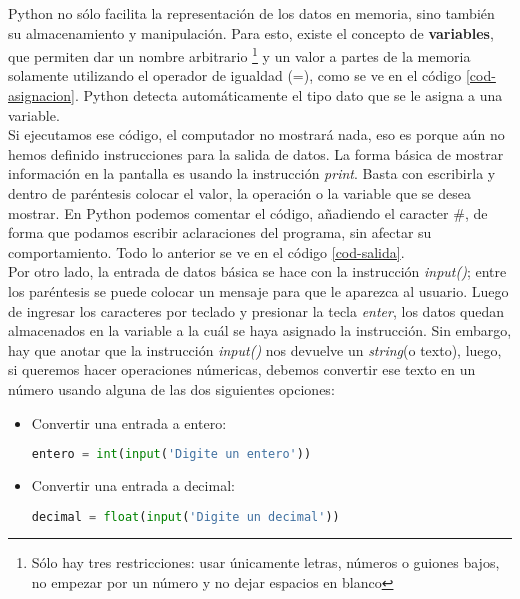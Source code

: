 Python no sólo facilita la representación de los datos en memoria, sino también su almacenamiento y manipulación. Para esto, existe el concepto de \textbf{variables}, que permiten dar un nombre arbitrario \footnote{Sólo hay tres restricciones: usar únicamente letras, números o guiones bajos, no empezar por un número y no dejar espacios en blanco} y un valor a partes de la memoria solamente utilizando el operador de igualdad (=), como se ve en el código \ref{cod-asignacion}. Python detecta automáticamente el tipo dato que se le asigna a una variable. \\



Si ejecutamos ese código, el computador no mostrará nada, eso es porque aún no hemos definido instrucciones para la salida de datos. La forma básica de mostrar información en la pantalla es usando la instrucción \emph{print}. Basta con escribirla y dentro de paréntesis colocar el valor, la operación o la variable que se desea mostrar. En Python podemos comentar el código, añadiendo el caracter \#, de forma que podamos escribir aclaraciones del programa, sin afectar su comportamiento. Todo lo anterior se ve en el código \ref{cod-salida}. \\




Por otro lado, la entrada de datos básica se hace con la instrucción \emph{input()}; entre los paréntesis se puede colocar un mensaje para que le aparezca al usuario. Luego de ingresar los caracteres por teclado y presionar la tecla \emph{enter}, los datos quedan almacenados en la variable a la cuál se haya asignado la instrucción. Sin embargo, hay que anotar que la instrucción \emph{input()} nos devuelve un \emph{string}(o texto), luego, si queremos hacer operaciones númericas, debemos convertir ese texto en un número usando alguna de las dos siguientes opciones:

\begin{itemize}
 \item Convertir una entrada a entero: 
 \begin{lstlisting}[language=Python]
 entero = int(input('Digite un entero')) \end{lstlisting}
 \item Convertir una entrada a decimal:
 \begin{lstlisting}[language=Python]
 decimal = float(input('Digite un decimal')) \end{lstlisting}
\end{itemize}

